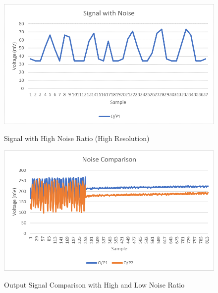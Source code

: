 \begin{figure}
	\begin{center}
		\includegraphics[width=1\textwidth]{Pics/3}
		\caption{Signal with High Noise Ratio (High Resolution)}
		\label{fig:4.1}
		\vspace{2cm}
		\includegraphics[width=1\textwidth]{Pics/1}
		\caption{Output Signal Comparison with High and Low Noise Ratio}
		\label{fig:4.2}
		\vspace{2cm}
	\end{center}
\end{figure}
\newpage
